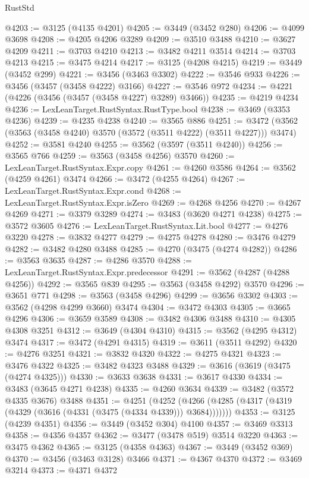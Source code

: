 \begin{lexlean}{RustStd}
\begin{coremodule}
{\begin{coremodule}
{{{{{{{{{{{{{{{{{{{{{{{{{{{{{{{{{{{{{{{{{{{{{@4203 := @3125 (@4135 @4201)
@4205 := @3449 (@3452 @280)
@4206 := @4099 @3698
@4208 := @4205 @4206 @3289
@4209 := @3510 @3488
@4210 := @3627 @4209
@4211 := @3703 @4210
@4213 := @3482 @4211 @3514
@4214 := @3703 @4213
@4215 := @3475 @4214
@4217 := @3125 (@4208 @4215)
@4219 := @3449 (@3452 @299)
@4221 := @3456 (@3463 @3302)
@4222 := @3546 @933
@4226 := @3456 (@3457 (@3458 @4222) @3166)
@4227 := @3546 @972
@4234 := @4221 (@4226 (@3456 (@3457 (@3458 @4227) @3289) @3466))
@4235 := @4219 @4234
@4236 := LexLeanTarget.RustSyntax.RustType.bool
@4238 := @3469 (@3353 @4236)
@4239 := @4235 @4238
@4240 := @3565 @886
@4251 := @3472 (@3562 (@3563 (@3458 @4240) @3570 (@3572 (@3511 @4222) (@3511 @4227))) @3474)
@4252 := @3581 @4240
@4255 := @3562 (@3597 (@3511 @4240))
@4256 := @3565 @766
@4259 := @3563 (@3458 @4256) @3570
@4260 := LexLeanTarget.RustSyntax.Expr.copy
@4261 := @4260 @3586
@4264 := @3562 (@4259 @4261) @3474
@4266 := @3472 (@4255 @4264)
@4267 := LexLeanTarget.RustSyntax.Expr.cond
@4268 := LexLeanTarget.RustSyntax.Expr.isZero
@4269 := @4268 @4256
@4270 := @4267 @4269
@4271 := @3379 @3289
@4274 := @3483 (@3620 @4271 @4238)
@4275 := @3572 @3605
@4276 := LexLeanTarget.RustSyntax.Lit.bool
@4277 := @4276 @3220
@4278 := @3832 @4277
@4279 := @4275 @4278
@4280 := @3476 @4279
@4282 := @3482 @4280 @3488
@4285 := @4270 (@3475 (@4274 @4282))
@4286 := @3563 @3635
@4287 := @4286 @3570
@4288 := LexLeanTarget.RustSyntax.Expr.predecessor
@4291 := @3562 (@4287 (@4288 @4256))
@4292 := @3565 @839
@4295 := @3563 (@3458 @4292) @3570
@4296 := @3651 @771
@4298 := @3563 (@3458 @4296)
@4299 := @3656 @3302
@4303 := @3562 (@4298 @4299 @3660) @3474
@4304 := @3472 @4303
@4305 := @3665 @4296
@4306 := @3659 @3589
@4308 := @3482 @4306 @3488
@4310 := @4305 @4308 @3251
@4312 := @3649 (@4304 @4310)
@4315 := @3562 (@4295 @4312) @3474
@4317 := @3472 (@4291 @4315)
@4319 := @3611 (@3511 @4292)
@4320 := @4276 @3251
@4321 := @3832 @4320
@4322 := @4275 @4321
@4323 := @3476 @4322
@4325 := @3482 @4323 @3488
@4329 := @3616 (@3619 (@3475 (@4274 @4325)))
@4330 := @3633 @3638
@4331 := @3617 @4330
@4334 := @3483 (@3645 @4271 @4238)
@4335 := @4260 @3634
@4339 := @3482 (@3572 @4335 @3676) @3488
@4351 := @4251
    (@4252 (@4266 (@4285 (@4317 (@4319 (@4329 (@3616 (@4331 (@3475 (@4334 @4339))) @3684)))))))
@4353 := @3125 (@4239 @4351)
@4356 := @3449 (@3452 @304) @4100
@4357 := @3469 @3313
@4358 := @4356 @4357
@4362 := @3477 (@3478 @519) @3514 @3220
@4363 := @3475 @4362
@4365 := @3125 (@4358 @4363)
@4367 := @3449 (@3452 @369)
@4370 := @3456 (@3463 @3128) @3466
@4371 := @4367 @4370
@4372 := @3469 @3214
@4373 := @4371 @4372
}}}}}}}}}}}}}}}}}}}}}}}}}}}}}}}}}}}}}}}}}}}}}
\end{coremodule}}
\end{coremodule}
\end{lexlean}
